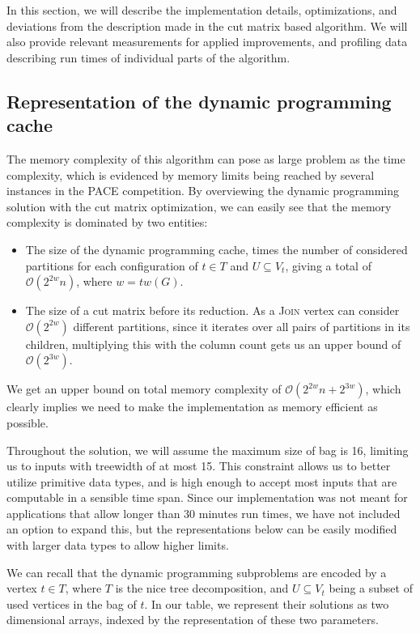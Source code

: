 \documentclass[thesis=M,english,hidelinks]{FITthesis}[2012/10/20]
\theoremstyle{definition}
\begin{document}
In this section, we will describe the implementation details, optimizations, and deviations from the description made
in the cut matrix based algorithm. We will also provide relevant measurements for applied improvements, and profiling
data describing run times of individual parts of the algorithm.

\subsection{Representation of the dynamic programming cache}
\label{subsec:dprepre}

The memory complexity of this algorithm can pose as large problem as the time complexity, which is evidenced by memory
limits being reached by several instances in the PACE competition. By overviewing the dynamic programming solution with the
cut matrix optimization, we can easily see that the memory complexity is dominated by two entities:
\begin{itemize}
    \item The size of the dynamic programming cache, times the number of considered partitions for each configuration of
        $t \in T$ and $U \subseteq V_t$, giving a total of $\mathcal{O}(2^{2w} n)$, where $w = tw(G)$.
    \item The size of a cut matrix before its reduction. As a \textsc{Join} vertex can consider $\mathcal{O}(2^{2w})$
        different partitions, since it iterates over all pairs of partitions in its children, multiplying this with the
        column count gets us an upper bound of $\mathcal{O}(2^{3w})$.
\end{itemize}

We get an upper bound on total memory complexity of $\mathcal{O}(2^{2w} n + 2^{3w})$, which clearly implies we need to
make the implementation as memory efficient as possible.

Throughout the solution, we will assume the maximum size of bag is 16, limiting us to inputs with treewidth of at most
15. This constraint allows us to better utilize primitive data types, and is high enough to accept most inputs that are
computable in a sensible time span. Since our implementation was not meant for applications that allow longer than 30
minutes run times, we have not included an option to expand this, but the representations below can be easily
modified with larger data types to allow higher limits.

We can recall that the dynamic programming subproblems are encoded by a vertex $t \in T$, where $T$ is the nice tree
decomposition, and $U \subseteq V_t$ being a subset of used vertices in the bag of $t$. In our table, we represent their
solutions as two dimensional arrays, indexed by the representation of these two parameters.
\end{document}
